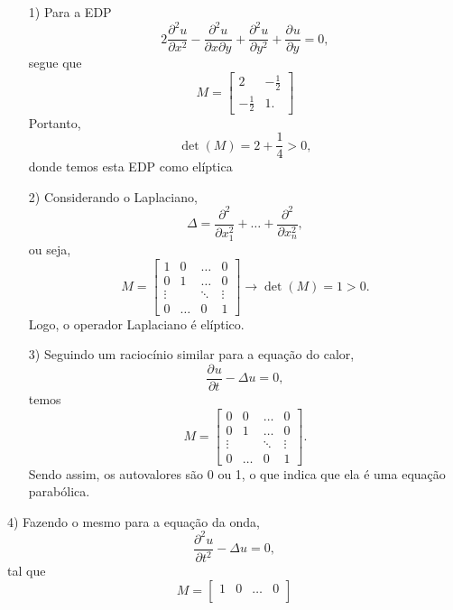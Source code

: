 \documentclass[.../pde_notes.tex]{subfiles}
\begin{document}
\begin{example}
	\begin{itemize}
		\item[1)] Para a EDP
		      \[
			      2 \frac{\partial^{2}u}{\partial x^{2}} - \frac{\partial^{2}u}{\partial x \partial y^{}} + \frac{\partial^{2}u}{\partial y^{2}} + \frac{\partial^{}u}{\partial y^{}} = 0,
		      \]
		      segue que
		      \[
			      M = \begin{bmatrix}
				      2            & -\frac{1}{2} \\
				      -\frac{1}{2} & 1.
			      \end{bmatrix}
		      \]
		      Portanto,
		      \[
			      \det{(M)} = 2 + \frac{1}{4} > 0,
		      \]
		      donde temos esta EDP como elíptica
		\item[2)] Considerando o Laplaciano,
		      \[
			      \Delta  = \frac{\partial^{2}}{\partial x_1^{2}} + \dotsc + \frac{\partial^{2}}{\partial x_{n}^{2}},
		      \]
		      ou seja,
		      \[
			      M = \begin{bmatrix}
				      1      & 0      & \dotsc & 0      \\
				      0      & 1      & \dotsc & 0      \\
				      \vdots &        & \ddots & \vdots \\
				      0      & \dotsc & 0      & 1
			      \end{bmatrix} \rightarrow \det{(M)} = 1 > 0.
		      \]
		      Logo, o operador Laplaciano é elíptico.
		\item[3)] Seguindo um raciocínio similar para a equação do calor,
		      \[
			      \frac{\partial^{}u}{\partial t^{}} - \Delta u = 0,
		      \]
		      temos
		      \[
			      M = \begin{bmatrix}
				      0      & 0      & \dotsc & 0      \\
				      0      & 1      & \dotsc & 0      \\
				      \vdots &        & \ddots & \vdots \\
				      0      & \dotsc & 0      & 1
			      \end{bmatrix}.
		      \]
		      Sendo assim, os autovalores são 0 ou 1, o que indica que ela é uma equação parabólica.
	\end{itemize}
	\item[4)] Fazendo o mesmo para a equação da onda,
	\[
		\frac{\partial^{2}u}{\partial t^{2}} - \Delta u = 0,
	\]
	tal que
	\[
		M = \begin{bmatrix}
			1      & 0      & \dotsc & 0      \\

\end{bmatrix}\]
\end{example}
\end{document}
